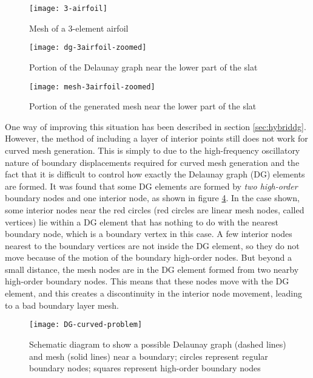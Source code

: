 \begin{figure}
	\centering
	\texttt{[image: 3-airfoil]}
	\caption{Mesh of a 3-element airfoil}
	\label{fig:wmesh}
\end{figure}
\begin{figure}
	\centering
	\texttt{[image: dg-3airfoil-zoomed]}
	\caption{Portion of the Delaunay graph near the lower part of the slat}
	\label{fig:wmesh-dg}
\end{figure}
\begin{figure}
	\centering
	\texttt{[image: mesh-3airfoil-zoomed]}
	\caption{Portion of the generated mesh near the lower part of the slat}
	\label{fig:wmesh-zoomed}
\end{figure}

One way of improving this situation has been described in section \ref{sec:hybriddg}. However, the method of including a layer of interior points still does not work for curved mesh generation. This is simply to due to the high-frequency oscillatory nature of boundary displacements required for curved mesh generation and the fact that it is difficult to control how exactly the Delaunay graph (DG) elements are formed. It was found that some DG elements are formed by \emph{two high-order} boundary nodes and one interior node, as shown in figure \ref{fig:dg-curved-problem}. In the case shown, some interior nodes near the red circles (red circles are linear mesh nodes, called vertices) lie within a DG element that has nothing to do with the nearest boundary node, which is a boundary vertex in this case. A few interior nodes nearest to the boundary vertices are not inside the DG element, so they do not move because of the motion of the boundary high-order nodes. But beyond a small distance, the mesh nodes are in the DG element formed from two nearby high-order boundary nodes. This means that these nodes move with the DG element, and this creates a discontinuity in the interior node movement, leading to a bad boundary layer mesh.
\begin{figure}[!h]
	\centering
	\texttt{[image: DG-curved-problem]}
	\caption{Schematic diagram to show a possible Delaunay graph (dashed lines) and mesh (solid lines) near a boundary; circles represent regular boundary nodes; squares represent high-order boundary nodes}
	\label{fig:dg-curved-problem}
\end{figure}

\FloatBarrier
